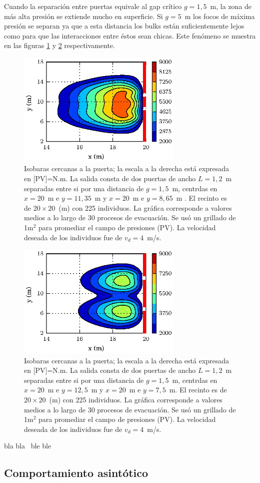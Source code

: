 Cuando la separación entre puertas equivale al gap crítico $g=1,5$~m, la zona de más alta presión se extiende mucho en superficie. Si $g=5$~m los focos de máxima presión se separan ya que a esta distancia los bulks están suficientemente lejos como para que las interacciones entre éstos sean chicas. Este fenómeno se muestra en las figuras \ref{presion_225p_g1_5} y \ref{presion_225p_g5} respectivamente.   

\begin{figure}[H]
    \centering
    \includegraphics[height=5.5cm]{figuras/isobaras_g1_5.eps}
    \caption[width=5cm]{Isobaras cercanas a la puerta; la escala a la derecha está expresada en [PV]=N.m. La salida consta de dos puertas de ancho $L=1,2$~m separadas entre si por una distancia de $g=1,5$~m, centrdas en $x=20$~m e $y=11,35$~m y $x=20$~m e $y=8,65$~m . El recinto es de $20\times 20$~(m) con 225 individuos. La gráfica corresponde a valores medios a lo largo de 30 procesos de evacuación. Se usó un grillado de 1m$^2$ para promediar el campo de presiones (PV). La velocidad deseada de los individuos fue de $v_d=4$~m/s.}
    \label{presion_225p_g1_5}
\end{figure}

\begin{figure}[H]
    \centering
    \includegraphics[height=5.5cm]{figuras/isobaras_g5.eps}			\caption[width=5cm]{Isobaras cercanas a la puerta; la escala a la derecha está expresada en [PV]=N.m. La salida consta de dos puertas de ancho $L=1,2$~m separadas entre si por una distancia de $g=1,5$~m, centrdas en $x=20$~m e $y=12,5$~m y $x=20$~m e $y=7,5$~m. El recinto es de $20\times 20$~(m) con 225 individuos. La gráfica corresponde a valores medios a lo largo de 30 procesos de evacuación. Se usó un grillado de 1m$^2$ para promediar el campo de presiones (PV). La velocidad deseada de los individuos fue de $v_d=4$~m/s.}
    \label{presion_225p_g5}
\end{figure}

bla bla~\cite{Jensen}
ble ble~\cite{Haile} 

\subsection{Comportamiento asintótico}


